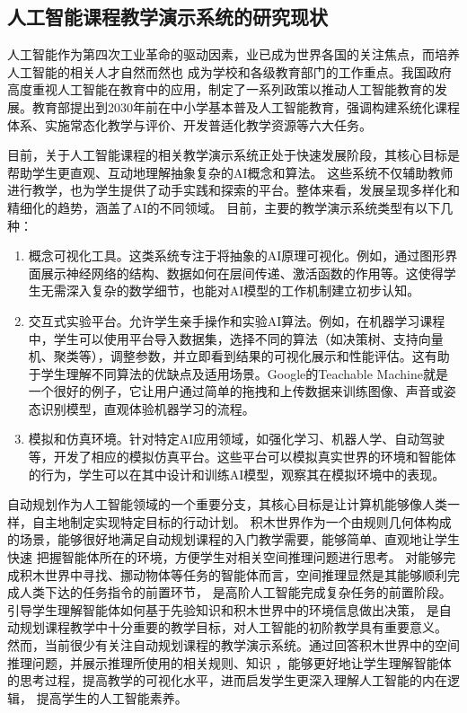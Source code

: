 \subsection{人工智能课程教学演示系统的研究现状}
人工智能作为第四次工业革命的驱动因素，业已成为世界各国的关注焦点，而培养人工智能的相关人才自然而然也
成为学校和各级教育部门的工作重点。我国政府高度重视人工智能在教育中的应用，制定了一系列政策以推动人工智能教育的发展。
​教育部提出到2030年前在中小学基本普及人工智能教育，强调构建系统化课程体系、实施常态化教学与评价、开发普适化教学资源等六大任务。\cite{moe_ai_2024}

目前，关于人工智能课程的相关教学演示系统正处于快速发展阶段，其核心目标是帮助学生更直观、互动地理解抽象复杂的AI概念和算法。
这些系统不仅辅助教师进行教学，也为学生提供了动手实践和探索的平台。整体来看，发展呈现多样化和精细化的趋势，涵盖了AI的不同领域。
目前，主要的教学演示系统类型有以下几种：
\begin{enumerate}[nosep]
\item 概念可视化工具。这类系统专注于将抽象的AI原理可视化。例如，通过图形界面展示神经网络的结构、数据如何在层间传递、激活函数的作用等。这使得学生无需深入复杂的数学细节，也能对AI模型的工作机制建立初步认知。
\item 交互式实验平台。允许学生亲手操作和实验AI算法。例如，在机器学习课程中，学生可以使用平台导入数据集，选择不同的算法（如决策树、支持向量机、聚类等），调整参数，并立即看到结果的可视化展示和性能评估。这有助于学生理解不同算法的优缺点及适用场景。Google的Teachable Machine就是一个很好的例子，它让用户通过简单的拖拽和上传数据来训练图像、声音或姿态识别模型，直观体验机器学习的流程。
\item 模拟和仿真环境。针对特定AI应用领域，如强化学习、机器人学、自动驾驶等，开发了相应的模拟仿真平台。这些平台可以模拟真实世界的环境和智能体的行为，学生可以在其中设计和训练AI模型，观察其在模拟环境中的表现。
\end{enumerate}

自动规划作为人工智能领域的一个重要分支，其核心目标是让计算机能够像人类一样，自主地制定实现特定目标的行动计划。
积木世界作为一个由规则几何体构成的场景，能够很好地满足自动规划课程的入门教学需要，能够简单、直观地让学生快速
把握智能体所在的环境，方便学生对相关空间推理问题进行思考。
对能够完成积木世界中寻找、挪动物体等任务的智能体而言，空间推理显然是其能够顺利完成人类下达的任务指令的前置环节，
是高阶人工智能完成复杂任务的前置阶段。引导学生理解智能体如何基于先验知识和积木世界中的环境信息做出决策，
是自动规划课程教学中十分重要的教学目标，对人工智能的初阶教学具有重要意义。
然而，当前很少有关注自动规划课程的教学演示系统。通过回答积木世界中的空间推理问题，并展示推理所使用的相关规则、知识
，能够更好地让学生理解智能体的思考过程，提高教学的可视化水平，进而启发学生更深入理解人工智能的内在逻辑，
提高学生的人工智能素养。


